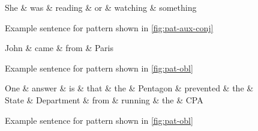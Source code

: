 \documentclass[11pt,a4paper]{article}
\begin{document}
\begin{figure}
    \centering
    \begin{dependency}
    \begin{deptext}[column sep=1em]
    She \& was \& reading \& or \& watching \& something  \\
    \end{deptext}
    \end{dependency}
    \caption{Example sentence for pattern shown in \cref{fig:pat-aux-conj}}
    \label{fig:reading-or-watching}
\end{figure}

\begin{figure}
    \centering
    \begin{dependency}
    \begin{deptext}[column sep=1em]
    John \& came \& from \& Paris  \\
    \end{deptext}
  \end{dependency}
  \caption{Example sentence for pattern shown in \cref{fig:pat-obl}}
  \label{fig:john-paris}
\end{figure}


\begin{figure*}
    \centering
    \begin{dependency}
    \begin{deptext}[column sep=0.1cm]
    One \& answer \& is \& that \& the \& Pentagon \& prevented \& the \& State \& Department \& from \& running \& the \& CPA  \\
    \end{deptext}
    \end{dependency}
    \caption{Example sentence for pattern shown in \cref{fig:pat-obl}}
    \label{fig:rel-clause}
\end{figure*}
\end{document}
